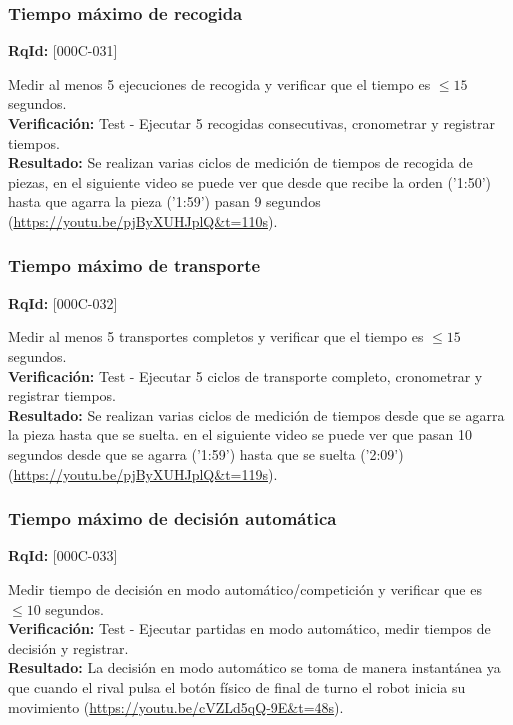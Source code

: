 \documentclass[12pt,a4paper]{article}
\begin{document}
\subsubsection{Tiempo máximo de recogida}
\textbf{RqId:} [000C-031]
\vspace{0.3em}
\par Medir al menos 5 ejecuciones de recogida y verificar que el tiempo es $\leq 15$ segundos.
\\ \textbf{Verificación:} Test - Ejecutar 5 recogidas consecutivas, cronometrar y registrar tiempos.
\\ \textbf{Resultado:} Se realizan varias ciclos de medición de tiempos de recogida de piezas, en el siguiente video se puede ver que desde que recibe la orden ('1:50') hasta que agarra la pieza ('1:59') pasan 9 segundos (\url{https://youtu.be/pjByXUHJplQ&t=110s}).

\subsubsection{Tiempo máximo de transporte}
\textbf{RqId:} [000C-032]
\vspace{0.3em}
\par Medir al menos 5 transportes completos y verificar que el tiempo es $\leq 15$ segundos.
\\ \textbf{Verificación:} Test - Ejecutar 5 ciclos de transporte completo, cronometrar y registrar tiempos.
\\ \textbf{Resultado:} Se realizan varias ciclos de medición de tiempos desde que se agarra la pieza hasta que se suelta. en el siguiente video se puede ver que pasan 10 segundos desde que se agarra ('1:59') hasta que se suelta ('2:09') (\url{https://youtu.be/pjByXUHJplQ&t=119s}).

\subsubsection{Tiempo máximo de decisión automática}
\textbf{RqId:} [000C-033]
\vspace{0.3em}
\par Medir tiempo de decisión en modo automático/competición y verificar que es $\leq 10$ segundos.
\\ \textbf{Verificación:} Test - Ejecutar partidas en modo automático, medir tiempos de decisión y registrar.
\\ \textbf{Resultado:} La decisión en modo automático se toma de manera instantánea ya que cuando el rival pulsa el botón físico de final de turno el robot inicia su movimiento (\url{https://youtu.be/cVZLd5qQ-9E&t=48s}).
\end{document}

